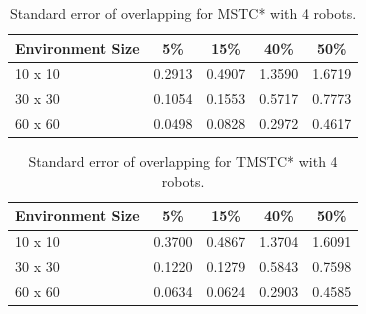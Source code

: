 \begin{table}[H]
    \caption{Standard error of overlapping for MSTC* with 4 robots.}
    \vspace{0.6em}
    \label{tab:overlapping_mstcstar_4robots}
    \centering
    \small
    \setlength{\tabcolsep}{10pt}
    \renewcommand{\arraystretch}{1.3}
    \begin{tabular}{lcccc}
        \hline
        \textbf{Environment Size} & \textbf{5\%} & \textbf{15\%} & \textbf{40\%} & \textbf{50\%} \\
        \hline
        10 x 10 & 0.2913 & 0.4907 & 1.3590 & 1.6719 \\
        30 x 30 & 0.1054 & 0.1553 & 0.5717 & 0.7773 \\
        60 x 60 & 0.0498 & 0.0828 & 0.2972 & 0.4617 \\
        \hline
    \end{tabular}
\end{table}

\begin{table}[H]
    \caption{Standard error of overlapping for TMSTC* with 4 robots.}
    \vspace{0.6em}
    \label{tab:overlapping_tmstcstar_4robots}
    \centering
    \small
    \setlength{\tabcolsep}{10pt}
    \renewcommand{\arraystretch}{1.3}
    \begin{tabular}{lcccc}
        \hline
        \textbf{Environment Size} & \textbf{5\%} & \textbf{15\%} & \textbf{40\%} & \textbf{50\%} \\
        \hline
        10 x 10 & 0.3700 & 0.4867 & 1.3704 & 1.6091 \\
        30 x 30 & 0.1220 & 0.1279 & 0.5843 & 0.7598 \\
        60 x 60 & 0.0634 & 0.0624 & 0.2903 & 0.4585 \\
        \hline
    \end{tabular}
\end{table}


